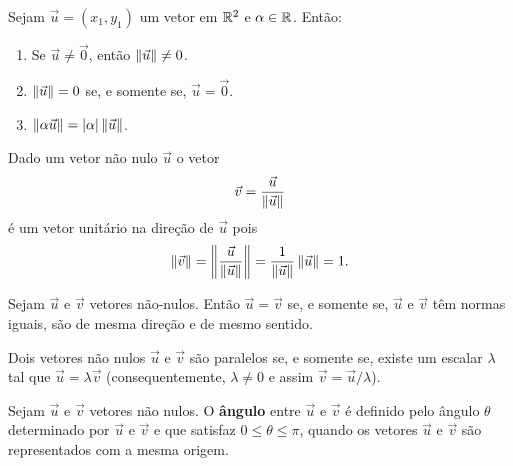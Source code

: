\documentclass{beamer}
\begin{document}
    \begin{frame}
        \begin{proposicao}
          Sejam $\vec{u} = (x_1, y_1)$ um vetor em $\mathbb{R}^2$ e $\alpha \in \mathbb{R}$. Então:
          \begin{enumerate}[label=({\roman*})]
            \item Se $\vec{u} \ne \vec{0}$, então $\left\Vert{\vec{u}}\right\Vert \ne 0$.
            \item $\left\Vert{\vec{u}}\right\Vert = 0$ se, e somente se, $\vec{u} = \vec{0}$.
            \item $\left\Vert{\alpha\vec{u}}\right\Vert = |\alpha|\left\Vert{\vec{u}}\right\Vert$.
          \end{enumerate}
        \end{proposicao}
    \end{frame}

    \begin{frame}
        \begin{observacao}
            Dado um vetor não nulo $\vec{u}$ o vetor
            \[
                  \vec{v} = \dfrac{\vec{u}}{\left\Vert{\vec{u}}\right\Vert}
            \]
            é um vetor unitário na direção de $\vec{u}$ pois
            \[
                  \left\Vert{\vec{v}}\right\Vert = \left\Vert{\dfrac{\vec{u}}{\left\Vert{\vec{u}}\right\Vert}}\right\Vert = \dfrac{1}{\left\Vert{\vec{u}}\right\Vert}\left\Vert{\vec{u}}\right\Vert = 1.
            \]

        \end{observacao}
    \end{frame}

    \begin{frame}
        \begin{definicao}
            Sejam $\vec{u}$ e $\vec{v}$ vetores não-nulos. Então $\vec{u} = \vec{v}$ se, e somente se, $\vec{u}$ e $\vec{v}$ têm normas iguais, são de mesma direção e de mesmo sentido.
        \end{definicao}

        \begin{proposicao}\label{vetores_paralelos}
          Dois vetores não nulos $\vec{u}$ e $\vec{v}$ são paralelos se, e somente se, existe um escalar $\lambda$ tal que $\vec{u} = \lambda\vec{v}$ (consequentemente, $\lambda \ne 0$ e assim $\vec{v} = \vec{u}/\lambda$).
        \end{proposicao}
    \end{frame}

    \begin{frame}
        \begin{definicao}
          Sejam $\vec{u}$ e $\vec{v}$ vetores não nulos. O \textbf{ângulo} entre $\vec{u}$ e $\vec{v}$ é definido pelo ângulo $\theta$ determinado por $\vec{u}$ e $\vec{v}$ e que satisfaz $0 \le \theta \le \pi$, quando os vetores $\vec{u}$ e $\vec{v}$ são representados com a mesma origem.
        \end{definicao}
    \end{frame}
\end{document}
